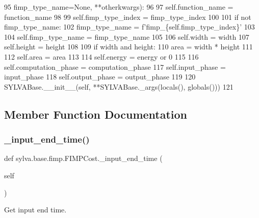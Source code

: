 \begin{DoxyCode}
95                  fimp\_type\_name=\textcolor{keywordtype}{None}, **otherkwargs):
96 
97         self.function\_name = function\_name
98 
99         self.fimp\_type\_index = fimp\_type\_index
100 
101         \textcolor{keywordflow}{if} \textcolor{keywordflow}{not} fimp\_type\_name:
102             fimp\_type\_name = f\textcolor{stringliteral}{'fimp\_\{self.fimp\_type\_index\}'}
103 
104         self.fimp\_type\_name = fimp\_type\_name
105 
106         self.width = width
107         self.height = height
108 
109         \textcolor{keywordflow}{if} width \textcolor{keywordflow}{and} height:
110             area = width * height
111 
112         self.area = area
113 
114         self.energy = energy \textcolor{keywordflow}{or} 0
115 
116         self.computation\_phase = computation\_phase
117         self.input\_phase = input\_phase
118         self.output\_phase = output\_phase
119 
120         SYLVABase.\_\_init\_\_(self, **SYLVABase.\_args(locals(), globals()))
121 
\end{DoxyCode}


\subsection{Member Function Documentation}
\mbox{\label{classsylva_1_1base_1_1fimp_1_1_f_i_m_p_cost_ab5c4e28ac7b7fb3fd3e14a66a564e989}} 
\subsubsection{\texorpdfstring{\+\_\+input\+\_\+end\+\_\+time()}{\_input\_end\_time()}}
{\footnotesize\ttfamily def sylva.\+base.\+fimp.\+F\+I\+M\+P\+Cost.\+\_\+input\+\_\+end\+\_\+time (\begin{DoxyParamCaption}\item[{}]{self }\end{DoxyParamCaption})\hspace{0.3cm}{\ttfamily [private]}}



Get input end time. 

